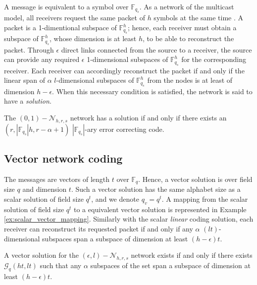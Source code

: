 A message is equivalent to a symbol over $\ensuremath{\mathbb{F}}_{q_{s}}$.
As a network of the multicast model, all receivers request the same
packet of $h$ symbols at the same time \cite{Trautmann:2013}. A
packet is a 1-dimentional subspace of $\ensuremath{\mathbb{F}}_{q_{s}}^{h}$;
hence, each receiver must obtain a subspace of $\ensuremath{\mathbb{F}}_{q_{s}}^{h}$,
whose dimension is at least $h$, to be able to reconstruct the packet.
Through $\epsilon$ direct links connected from the source to a receiver,
the source can provide any required $\epsilon$ 1-dimensional subspaces
of $\ensuremath{\mathbb{F}}_{q_{s}}^{h}$ for the corresponding receiver.
Each receiver can accordingly reconstruct the packet if and only if
the linear span of $\alpha$ $l$-dimensional subspaces of $\ensuremath{\mathbb{F}}_{q_{s}}^{h}$
from the nodes is at least of dimension $h-\epsilon$. When this necessary
condition is satisfied, the network is said to have a \textit{solution}.
\begin{thm}
The $(0,1)-\mathcal{N}_{h,r,s}$ network has a solution if and only
if there exists an $\left(r,\left|\ensuremath{\mathbb{F}}_{q_{s}}\right|h,r-\alpha+1\right)$
$\left|\ensuremath{\mathbb{F}}_{q_{s}}\right|$-ary error correcting
code. \cite{Riis:2006}
\end{thm}

\subsection{Vector network coding}

The messages are vectors of length $t$ over $\ensuremath{\mathbb{F}}_{q}$.
Hence, a vector solution is over field size $q$ and dimension $t$.
Such a vector solution has the same alphabet size as a scalar solution
of field size $q^{t}$, and we denote $q_{v}=q^{t}$. A mapping from
the scalar solution of field size $q^{t}$ to a equivalent vector
solution is represented in Example \ref{ex:scalar_vector_mapping}.
Similarly with the scalar \textit{linear} coding solution, each receiver
can reconstruct its requested packet if and only if any $\alpha$
$\left(lt\right)$-dimensional subspaces span a subspace of dimension
at least $\left(h-\epsilon\right)t$.
\begin{thm}
A vector solution for the $(\epsilon,l)-\mathcal{N}_{h,r,s}$ network
exists if and only if there exists $\mathcal{G}_{q}\left(ht,lt\right)$
such that any $\alpha$ subspaces of the set span a subspace of dimension
at least $\left(h-\epsilon\right)t$. \cite{Zhang:2019}
\end{thm}

